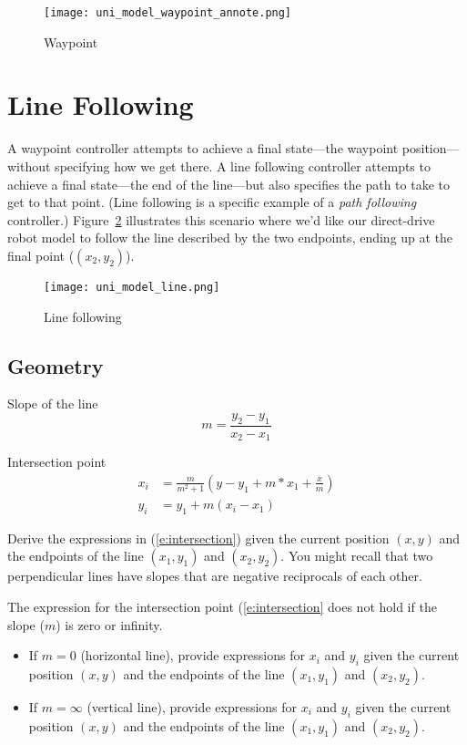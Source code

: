 \begin{figure}[hbt]
\centering
\texttt{[image: uni\_model\_waypoint\_annote.png]}
\caption{Waypoint}
\label{f:waypoint_annote}
\end{figure}


\section{Line Following}
A waypoint controller attempts to achieve a final state---the waypoint position---without specifying how we get there.  A line following controller attempts to achieve a final state---the end of the line---but also specifies the path to take to get to that point.  (Line following is a specific example of a \emph{path following} controller.)  Figure~\ref{f:line} illustrates this scenario where we'd like our direct-drive robot model to follow the line described by the two endpoints, ending up at the final point ($(x_2,y_2)$).

\begin{figure}[hbt]
\centering
\texttt{[image: uni\_model\_line.png]}
\caption{Line following}
\label{f:line}
\end{figure}

\subsection{Geometry}

Slope of the line
\[
m = \frac{y_2-y_1}{x_2-x_1}
\]

Intersection point
\begin{align}\label{e:intersection}
x_i & = \frac{m}{m^2+1}\left(y-y_1+m*x_1+\frac{x}{m}\right) \nonumber \\
y_i & = y_1+m(x_i-x_1) 
\end{align}

\begin{ex}
Derive the expressions in (\ref{e:intersection}) given the current position $(x,y)$ and the endpoints of the line $(x_1,y_1)$ and $(x_2,y_2)$.  You might recall that two perpendicular lines have slopes that are negative reciprocals of each other.
\end{ex}

\begin{ex}
The expression for the intersection point (\ref{e:intersection} does not hold if the slope ($m$) is zero or infinity.
\begin{itemize}
\item If $m=0$ (horizontal line), provide expressions for $x_i$ and $y_i$ given the current position $(x,y)$ and the endpoints of the line $(x_1,y_1)$ and $(x_2,y_2)$.
\item If $m=\infty$ (vertical line), provide expressions for $x_i$ and $y_i$ given the current position $(x,y)$ and the endpoints of the line $(x_1,y_1)$ and $(x_2,y_2)$.
\end{itemize}
\end{ex}



